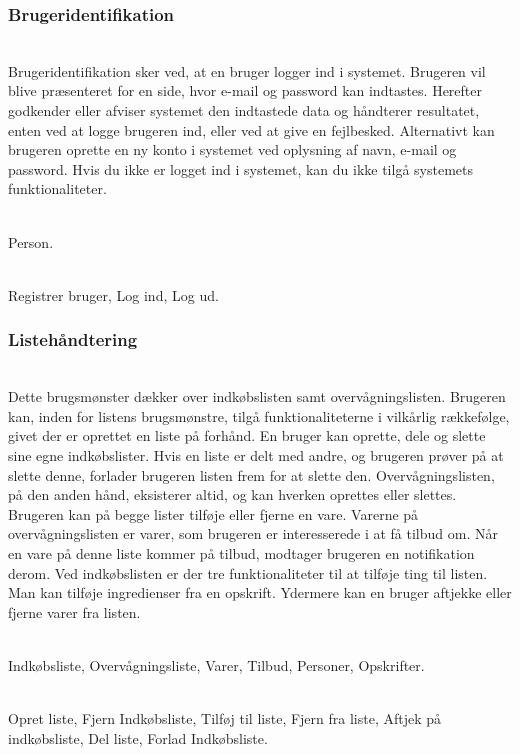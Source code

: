 \subsubsection{Brugeridentifikation}
\vspace{-6pt}
\begin{description}[font=\normalfont\itshape]
\item[Brugsmønster]\hfill\\
Brugeridentifikation sker ved, at en bruger logger ind i systemet.
Brugeren vil blive præsenteret for en side, hvor e-mail og password kan indtastes.
Herefter godkender eller afviser systemet den indtastede data og håndterer resultatet, enten ved at logge brugeren ind, eller ved at give en fejlbesked.
Alternativt kan brugeren oprette en ny konto i systemet ved oplysning af navn, e-mail og password.
Hvis du ikke er logget ind i systemet, kan du ikke tilgå systemets funktionaliteter.
\item[Objekter]\hfill\\
Person.
\item[Funktioner]\hfill\\
Registrer bruger, Log ind, Log ud.
\end{description}

\subsubsection{Listehåndtering}
\vspace{-6pt}
\begin{description}[font=\normalfont\itshape]
\item[Brugsmønster]\hfill\\
Dette brugsmønster dækker over indkøbslisten samt overvågningslisten.
Brugeren kan, inden for listens brugsmønstre, tilgå funktionaliteterne i vilkårlig rækkefølge, givet der er oprettet en liste på forhånd.
En bruger kan oprette, dele og slette sine egne indkøbslister.
Hvis en liste er delt med andre, og brugeren prøver på at slette denne, forlader brugeren listen frem for at slette den.
Overvågningslisten, på den anden hånd, eksisterer altid, og kan hverken oprettes eller slettes.
Brugeren kan på begge lister tilføje eller fjerne en vare.
Varerne på overvågningslisten er varer, som brugeren er interesserede i at få tilbud om.
Når en vare på denne liste kommer på tilbud, modtager brugeren en notifikation derom.
Ved indkøbslisten er der tre funktionaliteter til at tilføje ting til listen.
Man kan tilføje ingredienser fra en opskrift.
Ydermere kan en bruger aftjekke eller fjerne varer fra listen.
\item[Objekter]\hfill\\
Indkøbsliste, Overvågningsliste, Varer, Tilbud, Personer, Opskrifter.
\item[Funktioner]\hfill\\
Opret liste, Fjern Indkøbsliste, Tilføj til liste, Fjern fra liste, Aftjek på indkøbsliste, Del liste, Forlad Indkøbsliste.
\end{description}

